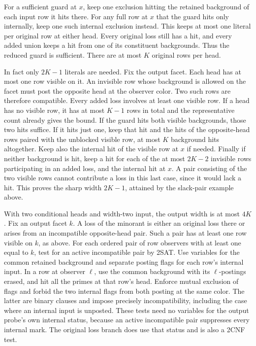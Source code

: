 For a sufficient guard at $x$,
keep one exclusion hitting the retained
background of each input row it hits there.
For any full row at $x$ that the guard hits
only internally, keep one such internal
exclusion instead. This keeps at most one
literal per original row at either head.
Every original loss still has a hit, and
every added union keeps a hit from one of
its constituent backgrounds. Thus the
reduced guard is sufficient. There are at
most $K$ original rows per head.

In fact only $2K-1$ literals are needed.
Fix the output facet. Each head has at
most one row visible on it. An invisible
row whose background is allowed on the
facet must post the opposite head at the
observer color. Two such rows are therefore
compatible. Every added loss involves at
least one visible row. If a head has no
visible row, it has at most $K-1$ rows in
total and the representative count already
gives the bound. If the guard hits both
visible backgrounds, those two hits suffice.
If it hits just one, keep that hit and the
hits of the opposite-head rows paired with
the unblocked visible row, at most $K$
background hits altogether. Keep also the
internal hit of the visible row at $x$ if
needed. Finally if neither background is
hit, keep a hit for each of the at most
$2K-2$ invisible rows participating in
an added loss, and the internal hit at $x$.
A pair consisting of the two visible rows
cannot contribute a loss in this last case,
since it would lack a hit. This proves
the sharp width $2K-1$, attained by the
slack-pair example above.

With two conditional heads and width-two input,
the output width is at most $4K$.
Fix an output facet $k$. A loss of the minorant
is either an original loss there or arises from
an incompatible opposite-head pair. Such a pair
has at least one row visible on $k$, as above.
For each ordered pair of row observers with
at least one equal to $k$, test for an active
incompatible pair by 2SAT. Use variables for
the common retained background and separate
posting flags for each row's internal input.
In a row at observer $\ell$, use the common
background with its $\ell$-postings erased,
and hit all the primes at that row's head.
Enforce mutual exclusion of flags and forbid
the two internal flags from both posting at
the same color. The latter are binary clauses
and impose precisely incompatibility, including
the case where an internal input is unposted.
These tests need no variables for the output
probe's own internal status, because an active
incompatible pair suppresses every internal
mark. The original loss branch does use that
status and is also a 2CNF test.

